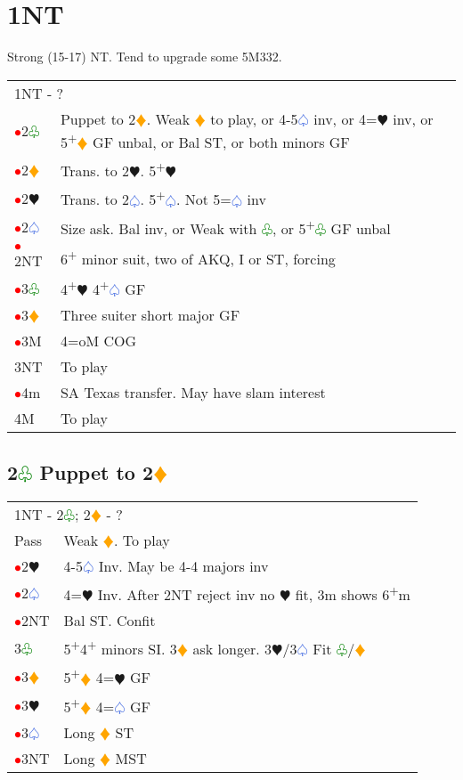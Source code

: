 \documentclass{article}
\renewcommand{\sp}{\textcolor{RoyalBlue}{$\varspade$}}
\newcommand{\he}{\textcolor{RubineRed}{$\varheart$}}
\newcommand{\di}{\textcolor{Orange}{$\vardiamond$}}
\newcommand{\cl}{\textcolor{Green}{$\varclub$}}
\newcommand{\nt}{\relsize{-1}NT\relsize{1}}
\newcommand{\up}{\textsuperscript{+}}
\newcommand{\al}{\textcolor{red}{$\bullet$}}
\begin{document}
\section{1\nt{}}

Strong (15-17) NT. Tend to upgrade some 5M332. \\

\begin{tabular}{|l|p{6.5cm}}
	\multicolumn{2}{l}{1\nt{} - ?}\\
     \al{}2\cl{} & Puppet to 2\di{}. Weak \di{} to play, or 4-5\sp{} inv, or 4=\he{} inv, or 5\up{}\di{} GF unbal, or Bal ST, or both minors GF \\
     \al{}2\di{} & Trans. to 2\he. 5\up\he{}\\
     \al{}2\he{}& Trans. to 2\sp{}. 5\up\sp{}. Not 5=\sp{} inv \\
     \al{}2\sp{} & Size ask. Bal inv, or Weak with \cl{}, or 5\up{}\cl{} GF unbal \\
     \al{}2\nt & 6\up{} minor suit, two of AKQ, I or ST, forcing \\
     \al{}3\cl{} & 4\up{}\he{} 4\up{}\sp{} GF \\
     \al{}3\di{} & Three suiter short major GF \\
     \al{}3M & 4=oM COG \\
     3\nt{} & To play \\
     \al{}4m & SA Texas transfer. May have slam interest \\
     4M & To play
\end{tabular}

\subsection{2\cl{} Puppet to 2\di{}}

\begin{tabular}{|l|p{6.5cm}}
	\multicolumn{2}{l}{1\nt{} - 2\cl{}; 2\di{} - ?}\\
	Pass & Weak \di{}. To play \\
	\al{}2\he{} & 4-5\sp{} Inv. May be 4-4 majors inv \\
	\al{}2\sp{} & 4=\he{} Inv. After 2\nt{} reject inv no \he{} fit, 3m shows 6\up{}m \\
	\al{}2\nt{} & Bal ST. Confit \\
	3\cl{} & 5\up{}4\up{} minors SI. 3\di{} ask longer. 3\he{}/3\sp{} Fit \cl{}/\di{} \\
	\al{}3\di{} & 5\up{}\di{} 4=\he{} GF \\
	\al{}3\he{} & 5\up{}\di{} 4=\sp{} GF \\
	\al{}3\sp{} & Long \di{} ST \\
	\al{}3\nt{} & Long \di{} MST \\
\end{tabular}
\end{document}
